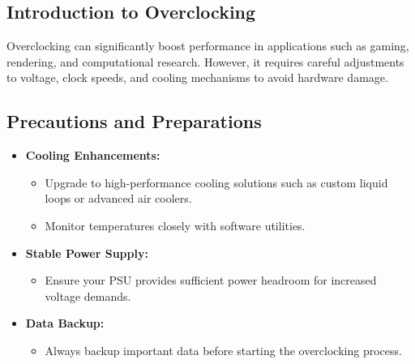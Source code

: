 \documentclass{article}
\begin{document}
\subsection{Introduction to Overclocking}
Overclocking can significantly boost performance in applications such as gaming, rendering, and computational research. However, it requires careful adjustments to voltage, clock speeds, and cooling mechanisms to avoid hardware damage.

\subsection{Precautions and Preparations}
\begin{itemize}[itemsep=5pt]
    \item \textbf{Cooling Enhancements:} 
    \begin{itemize}[label=--]
        \item Upgrade to high-performance cooling solutions such as custom liquid loops or advanced air coolers.
        \item Monitor temperatures closely with software utilities.
    \end{itemize}
    \item \textbf{Stable Power Supply:} 
    \begin{itemize}[label=--]
        \item Ensure your PSU provides sufficient power headroom for increased voltage demands.
    \end{itemize}
    \item \textbf{Data Backup:}
    \begin{itemize}[label=--]
        \item Always backup important data before starting the overclocking process.
    \end{itemize}
\end{itemize}
\end{document}
